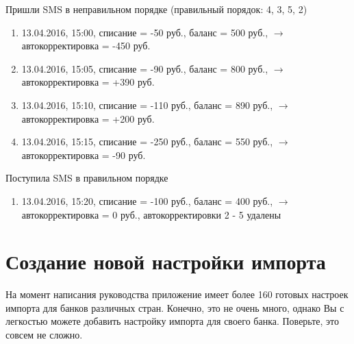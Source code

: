 \documentclass[a4paper,10pt,russian]{sphinxmanual}
\begin{document}
Пришли SMS в неправильном порядке (правильный порядок: 4, 3, 5, 2)
\begin{enumerate}
\def\theenumi{\arabic{enumi}}
\def\labelenumi{\theenumi .}
\makeatletter\def\p@enumii{\p@enumi \theenumi .}\makeatother
\setcounter{enumi}{1}
\item {} 
13.04.2016, 15:00, списание = -50 руб., баланс = 500 руб., \(\rightarrow\) автокорректировка = -450 руб.

\item {} 
13.04.2016, 15:05, списание = -90 руб., баланс = 800 руб., \(\rightarrow\) автокорректировка = +390 руб.

\item {} 
13.04.2016, 15:10, списание = -110 руб., баланс = 890 руб., \(\rightarrow\) автокорректировка = +200 руб.

\item {} 
13.04.2016, 15:15, списание = -250 руб., баланс = 550 руб., \(\rightarrow\) автокорректировка = -90 руб.

\end{enumerate}

Поступила SMS в правильном порядке
\begin{enumerate}
\def\theenumi{\arabic{enumi}}
\def\labelenumi{\theenumi .}
\makeatletter\def\p@enumii{\p@enumi \theenumi .}\makeatother
\setcounter{enumi}{5}
\item {} 
13.04.2016, 15:20, списание = -100 руб., баланс = 400 руб., \(\rightarrow\) автокорректировка = 0 руб., автокорректировки 2 - 5 удалены

\end{enumerate}


\section{Создание новой настройки импорта}
\label{\detokenize{notifications:id2}}
На момент написания руководства приложение имеет более 160 готовых настроек импорта для банков различных стран.
Конечно, это не очень много, однако Вы с легкостью можете добавить настройку импорта для своего банка.
Поверьте, это совсем не сложно.

\noindent{}

\noindent{}

\noindent{}
\end{document}
